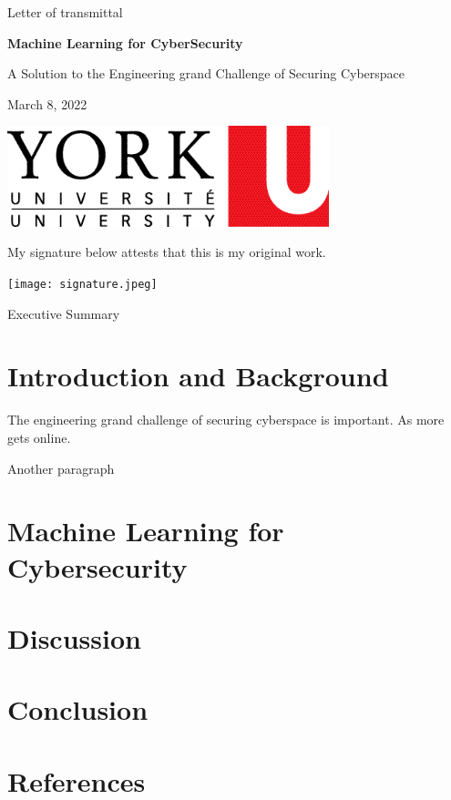 \documentclass{article}
\begin{document}
    Letter of transmittal

    \pagebreak

    \begin{titlepage}
        \begin{center}
            \vspace*{1cm}

            \Huge\textbf{Machine Learning for CyberSecurity}

            \vspace*{0.5cm}

            \LARGE A Solution to the Engineering grand Challenge of Securing Cyberspace

            \vspace*{1.5cm}

            \Large March 8, 2022

            \vfill

            \includegraphics[width=0.7\textwidth]{YorkU_Logo.png}

            \vspace*{1cm}

            \large My signature below attests that this is my original work.

            \texttt{[image: signature.jpeg]}
        \end{center}
    \end{titlepage}

    Executive Summary

    \pagebreak

    \tableofcontents

    \pagebreak

    \section{Introduction and Background}
    The engineering grand challenge of securing cyberspace is important.
    As more gets online.

    Another paragraph

    \section{Machine Learning for Cybersecurity}

    \section{Discussion}

    \pagebreak

    \section{Conclusion}

    \pagebreak

    \section{References}
\end{document}
